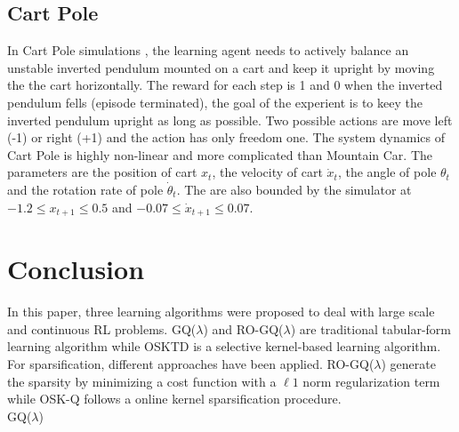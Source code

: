 \documentclass[conference]{IEEEtran}
\begin{document}
\subsection{Cart Pole}
In Cart Pole simulations \cite{sutton1998reinforcement}, the learning agent needs to actively balance an unstable inverted pendulum mounted on a cart and keep it upright by moving the the cart horizontally. The reward for each step is 1 and 0 when the inverted pendulum fells (episode terminated), the goal of the experient is to keey the inverted pendulum upright as long as possible. Two possible actions are move left (-1) or right (+1) and the action has only freedom one. The system dynamics of Cart Pole is highly non-linear and more complicated than Mountain Car. The parameters are the position of cart $x_t$, the velocity of cart $\dot{x}_t$, the angle of pole $\theta_t$ and the rotation rate of pole $\dot{\theta}_t$. The are also bounded by the simulator at $-1.2 \leq x_{t+1} \leq 0.5$ and $-0.07 \leq \dot{x}_{t+1} \leq0.07$.
\section{Conclusion}
In this paper, three learning algorithms were proposed to deal with large scale and continuous RL problems. GQ($\lambda$) and RO-GQ($\lambda$) are traditional tabular-form learning algorithm while OSKTD is a selective kernel-based learning algorithm. For sparsification, different approaches have been applied. RO-GQ($\lambda$) generate the sparsity by minimizing a cost function with a $\ell1$ norm regularization term while OSK-Q follows a online kernel sparsification procedure.\\

GQ($\lambda$)



%
\end{document}
